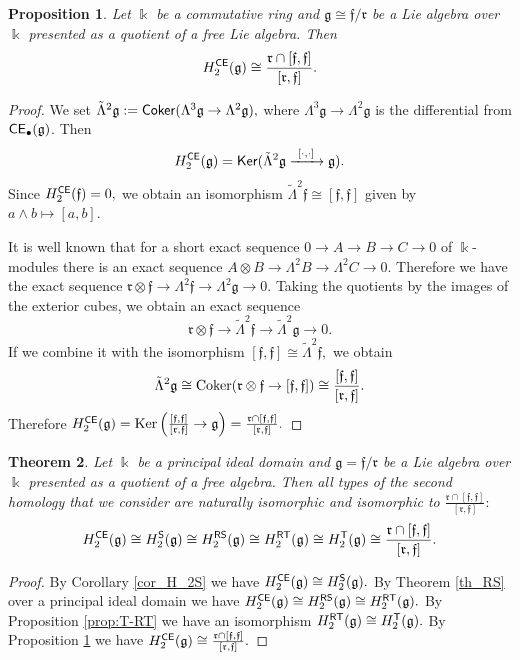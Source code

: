 \documentclass{amsart}
\numberwithin{equation}{section}
\newtheorem{theorem}{Theorem}[section]
\newtheorem{proposition}[theorem]{Proposition}
\theoremstyle{definition}
\def\gg{\mathfrak{g}}
\def\ff{\mathfrak{f}}
\def\rr{\mathfrak{r}}
\def\kk{\Bbbk}
\begin{document}
 
\begin{proposition}\label{prop:hopfCE}
Let $\kk$ be a commutative ring and $\gg\cong \ff/\rr$ be a Lie algebra over $\kk$ presented as a quotient of a free Lie algebra. Then 
$$H_2^{\sf CE}(\gg)\cong \frac{\rr \cap [\ff,\ff]}{[\rr,\ff]}.$$
\end{proposition}
\begin{proof}
We set $\tilde \Lambda^2 \gg  :={\sf Coker}(\Lambda^3 \gg \to \Lambda^2 \gg ),$ where $\Lambda^3 \gg \to \Lambda^2 \gg $ is the differential from ${\sf CE}_\bullet(\gg)$. Then 
$$ H_2^{\sf CE}(\gg) = {\sf Ker}( \tilde \Lambda^2 \gg \xrightarrow{\ [\cdot,\cdot]\ } \gg).$$
Since $H_2^{\sf CE}(\ff)=0,$ we obtain an isomorphism $\tilde \Lambda^2\ff \cong [\ff,\ff]$ given by $a\wedge b\mapsto [a,b].$ 

It is well known that for a short exact sequence $0\to A\to B\to C\to 0$ of $\kk$-modules there is an exact sequence $A\otimes B \to \Lambda^2 B \to \Lambda^2 C\to 0.$ 
Therefore we have the  exact sequence 
$\rr\otimes \ff\to \Lambda^2 \ff \to \Lambda^2 \gg \to 0.$ Taking the quotients by the images of the exterior cubes, we obtain an exact sequence  
$$\rr \otimes \ff \to \tilde \Lambda^2 \ff \to \tilde\Lambda^2 \gg\to 0.$$ If we combine it with the isomorphism $[\ff,\ff]\cong \tilde \Lambda^2 \ff,$ we obtain 
$$\tilde \Lambda^2 \gg \cong {\rm Coker}(\rr\otimes\ff \to [\ff,\ff])\cong \frac{[\ff,\ff]}{[\rr,\ff]}.$$ 
Therefore $H_2^{\sf CE}(\gg)={\rm Ker}\left( \frac{[\ff,\ff]}{[\rr,\ff]} \to \gg\right) = \frac{\rr\cap [\ff,\ff]}{[\rr,\ff]}.$
\end{proof}





\begin{theorem} \label{th_hopf}
Let $\kk$ be a principal ideal domain and $\gg=\ff/\rr$ be a Lie algebra over $\kk$ presented as a quotient of a free algebra. Then all types of the second homology that we consider are naturally isomorphic and isomorphic to $\frac{\rr \cap [\ff,\ff]}{[\rr,\ff]}:$
$$H_{2}^{\sf CE}(\gg)\cong H_2^{\sf S}(\gg)\cong H_2^{\sf RS}(\gg)\cong H^{\sf RT}_2(\gg) \cong  H_2^{\sf T}(\gg)\cong \frac{\rr \cap [\ff,\ff]}{[\rr,\ff]}.$$
\end{theorem}
\begin{proof} By Corollary \ref{cor_H_2S} we have $H_2^{\sf CE}(\gg)\cong H_2^{\sf S}(\gg).$ 
By Theorem \ref{th_RS} over a principal ideal domain we have  $H_2^{\sf CE}(\gg)\cong H_2^{\sf RS}(\gg)\cong  H_2^{\sf RT}(\gg).$  By Proposition \ref{prop:T-RT} we have an isomorphism $H_2^{\sf RT}(\gg) \cong H_2^{\sf T}(\gg).$ By Proposition \ref{prop:hopfCE} we have $H_2^{\sf CE}(\gg)\cong \frac{\rr\cap [\ff,\ff]}{[\rr,\ff]}.$
\end{proof}
\end{document}
